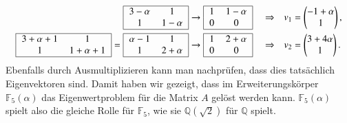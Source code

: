 \[
\begin{aligned}
\begin{tabular}{|>{$}c<{$}>{$}c<{$}|}
\hline
3-\alpha &1       \\
1        &1-\alpha\\
\hline
\end{tabular}
&\rightarrow
\begin{tabular}{|>{$}c<{$}>{$}c<{$}|}
\hline
1        &1-\alpha\\
0        &0       \\
\hline
\end{tabular}
&&\Rightarrow
&v_1&=\begin{pmatrix}-1+\alpha\\ 1 \end{pmatrix},
\\
\begin{tabular}{|>{$}c<{$}>{$}c<{$}|}
\hline
3+\alpha+1 &1       \\
1        &1+\alpha+1\\
\hline
\end{tabular}
=
\begin{tabular}{|>{$}c<{$}>{$}c<{$}|}
\hline
\alpha-1 &1       \\
1        &2+\alpha\\
\hline
\end{tabular}
&\rightarrow
\begin{tabular}{|>{$}c<{$}>{$}c<{$}|}
\hline
1        &2+\alpha\\
0        &0       \\
\hline
\end{tabular}
&&\Rightarrow
&v_2&=\begin{pmatrix}3+4\alpha\\ 1 \end{pmatrix}.
\end{aligned}
\]
Ebenfalls durch Ausmultiplizieren kann man nachprüfen, dass dies tatsächlich
Eigenvektoren sind.
Damit haben wir gezeigt, dass im Erweiterungskörper $\mathbb F_5(\alpha)$
das Eigenwertproblem für die Matrix $A$ gelöst werden kann.
$\mathbb F_5(\alpha)$ spielt also die gleiche Rolle für $\mathbb F_5$, wie
sie $\mathbb Q(\!\sqrt{2})$ für $\mathbb Q$ spielt.

